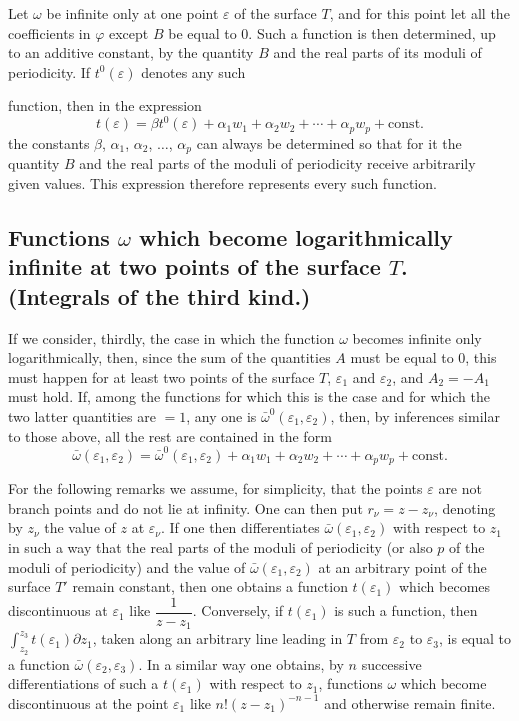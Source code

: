 \documentclass{article}
\begin{document}
Let $\omega$ be infinite only at one point $\varepsilon$ of the surface $T$, and for this point let all the coefficients in $\varphi$ except $B$ be equal to 0. Such a function is then determined, up to an additive constant, by the quantity $B$ and the real parts of its moduli of periodicity. If $t^{0}(\varepsilon)$ denotes any such

function, then in the expression
\[ t(\varepsilon) = \beta t^{0}(\varepsilon) + \alpha_{1} w_{1} + \alpha_{2} w_{2} + \cdots + \alpha_{p} w_{p} + \text{const.} \]
the constants $\beta$, $\alpha_{1}$, $\alpha_{2}$, $\ldots$, $\alpha_{p}$ can always be determined so that for it the quantity $B$ and the real parts of the moduli of periodicity receive arbitrarily given values. This expression therefore represents every such function.

\subsection*{Functions $\omega$ which become logarithmically infinite at two points of the surface $T$. (Integrals of the third kind.)}

If we consider, thirdly, the case in which the function $\omega$ becomes infinite only logarithmically, then, since the sum of the quantities $A$ must be equal to 0, this must happen for at least two points of the surface $T$, $\varepsilon_{1}$ and $\varepsilon_{2}$, and $A_{2} = -A_{1}$ must hold. If, among the functions for which this is the case and for which the two latter quantities are $= 1$, any one is $\bar{\omega}^{0}(\varepsilon_{1}, \varepsilon_{2})$, then, by inferences similar to those above, all the rest are contained in the form
\[ \bar{\omega}(\varepsilon_{1}, \varepsilon_{2}) = \bar{\omega}^{0}(\varepsilon_{1}, \varepsilon_{2}) + \alpha_{1} w_{1} + \alpha_{2} w_{2} + \cdots + \alpha_{p} w_{p} + \text{const.} \]

For the following remarks we assume, for simplicity, that the points $\varepsilon$ are not branch points and do not lie at infinity. One can then put $r_{\nu} = z - z_{\nu}$, denoting by $z_{\nu}$ the value of $z$ at $\varepsilon_{\nu}$. If one then differentiates $\bar{\omega}(\varepsilon_{1}, \varepsilon_{2})$ with respect to $z_{1}$ in such a way that the real parts of the moduli of periodicity (or also $p$ of the moduli of periodicity) and the value of $\bar{\omega}(\varepsilon_{1}, \varepsilon_{2})$ at an arbitrary point of the surface $T'$ remain constant, then one obtains a function $t(\varepsilon_{1})$ which becomes discontinuous at $\varepsilon_{1}$ like $\dfrac{1}{z - z_{1}}$. Conversely, if $t(\varepsilon_{1})$ is such a function, then $\displaystyle\int_{z_{2}}^{z_{3}} t(\varepsilon_{1}) \partial z_{1}$, taken along an arbitrary line leading in $T$ from $\varepsilon_{2}$ to $\varepsilon_{3}$, is equal to a function $\bar{\omega}(\varepsilon_{2}, \varepsilon_{3})$. In a similar way one obtains, by $n$ successive differentiations of such a $t(\varepsilon_{1})$ with respect to $z_{1}$, functions $\omega$ which become discontinuous at the point $\varepsilon_{1}$ like $n!(z - z_{1})^{-n-1}$ and otherwise remain finite.
\end{document}
